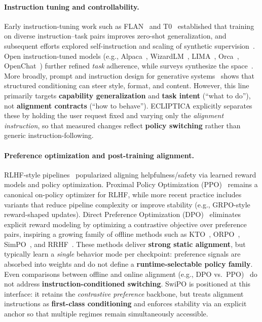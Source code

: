 \paragraph{Instruction tuning and controllability.}
Early instruction-tuning work such as FLAN~\cite{wei2022finetuned,chung2022scaling,longpre2023flan} and T0~\cite{sanh2022multitask} established that training on diverse instruction--task pairs improves zero-shot generalization, and subsequent efforts explored self-instruction and scaling of synthetic supervision~\cite{wang2023self,iyer2022opt,mishra2022cross}. Open instruction-tuned models (e.g., Alpaca~\cite{taori2023alpaca}, WizardLM~\cite{xu2023wizardlm}, LIMA~\cite{zhou2023lima}, Orca~\cite{mukherjee2023orca}, OpenChat~\cite{wang2023openchat}) further refined \emph{task} adherence, while surveys synthesize the space~\cite{peng2023instruction}. More broadly, prompt and instruction design for generative systems~\cite{yang2023prompt} shows that structured conditioning can steer style, format, and content. However, this line primarily targets \textbf{capability generalization} and \textbf{task intent} (``what to do''), not \textbf{alignment contracts} (``how to behave''). ECLIPTICA explicitly separates these by holding the user request fixed and varying only the \emph{alignment instruction}, so that measured changes reflect \textbf{policy switching} rather than generic instruction-following.

\paragraph{Preference optimization and post-training alignment.}
RLHF-style pipelines~\cite{ouyang2022training} popularized aligning helpfulness/safety via learned reward models and policy optimization. Proximal Policy Optimization (PPO)~\cite{schulman2017proximal} remains a canonical on-policy optimizer for RLHF, while more recent practice includes variants that reduce pipeline complexity or improve stability (e.g., GRPO-style reward-shaped updates). Direct Preference Optimization (DPO)~\cite{rafailov2023direct} eliminates explicit reward modeling by optimizing a contrastive objective over preference pairs, inspiring a growing family of offline methods such as KTO~\cite{ethayarajh2024kto}, ORPO~\cite{hong2024orpo}, SimPO~\cite{meng2024simpo}, and RRHF~\cite{yuan2023rrhf}. These methods deliver \textbf{strong static alignment}, but typically learn a \emph{single} behavior mode per checkpoint: preference signals are absorbed into weights and do not define a \textbf{runtime-selectable policy family}. Even comparisons between offline and online alignment (e.g., DPO vs.\ PPO)~\cite{xu2024dpo} do not address \textbf{instruction-conditioned switching}. SwiPO is positioned at this interface: it retains the \emph{contrastive preference} backbone, but treats alignment instructions as \textbf{first-class conditioning} and enforces stability via an explicit anchor so that multiple regimes remain simultaneously accessible.

